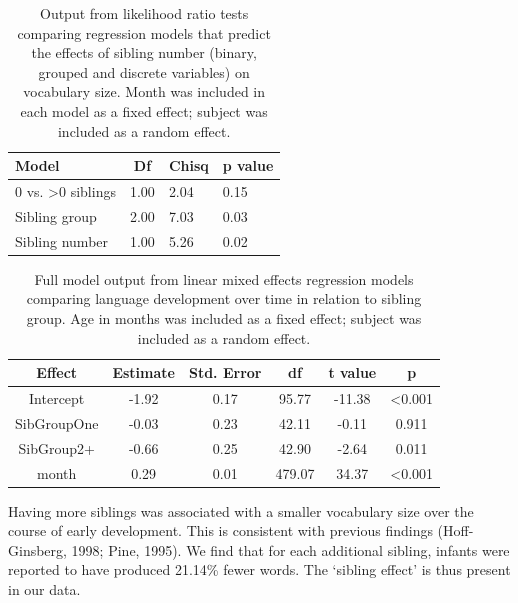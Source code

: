 \documentclass[
  english,
  man,floatsintext]{apa6}
\begin{document}
\begin{table}[H]

\begin{center}
\begin{threeparttable}

\caption{\label{tab:table-sibling-model-output}Output from likelihood ratio tests comparing regression models that predict the effects of sibling number (binary, grouped and discrete variables) on vocabulary size. Month was included in each model as a fixed effect; subject was included as a random effect.}

\small{

\begin{tabular}{llll}
\toprule
Model & \multicolumn{1}{c}{Df} & \multicolumn{1}{c}{Chisq} & \multicolumn{1}{c}{p value}\\
\midrule
0 vs. >0 siblings & 1.00 & 2.04 & 0.15\\
Sibling group & 2.00 & 7.03 & 0.03\\
Sibling number & 1.00 & 5.26 & 0.02\\
\bottomrule
\end{tabular}

}

\end{threeparttable}
\end{center}

\end{table}

\begin{longtable}[t]{cccccc}
\caption{\label{tab:table-sibgroup-model-summary}Full model output from linear mixed effects regression models comparing language development over time in relation to sibling group. Age in months was included as a fixed effect; subject was included as a random effect.}\\
\toprule
Effect & Estimate & Std. Error & df & t value & p\\
\midrule
Intercept & -1.92 & 0.17 & 95.77 & -11.38 & <0.001\\
SibGroupOne & -0.03 & 0.23 & 42.11 & -0.11 & 0.911\\
SibGroup2+ & -0.66 & 0.25 & 42.90 & -2.64 & 0.011\\
month & 0.29 & 0.01 & 479.07 & 34.37 & <0.001\\
\bottomrule
\end{longtable}

Having more siblings was associated with a smaller vocabulary size over the course of early development. This is consistent with previous findings (Hoff-Ginsberg, 1998; Pine, 1995). We find that for each additional sibling, infants were reported to have produced 21.14\% fewer words. The `sibling effect' is thus present in our data.
\end{document}
